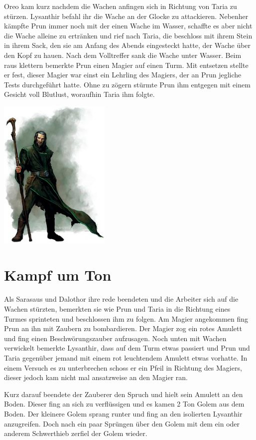 \documentclass[10pt,twoside,twocolumn,openany]{book}
\begin{document}
	Oreo kam kurz nachdem die Wachen anfingen sich in Richtung von Taria zu stürzen. Lysanthir befahl ihr die Wache an der Glocke zu attackieren. Nebenher kämpfte Prun immer noch mit der einen Wache im Wasser, schaffte es aber nicht die Wache alleine zu ertränken und rief nach Taria, die beschloss mit ihrem Stein in ihrem Sack, den sie am Anfang des Abends eingesteckt hatte, der Wache über den Kopf zu hauen. Nach dem Volltreffer sank die Wache unter Wasser. Beim raus klettern bemerkte Prun einen Magier auf einen Turm. Mit entsetzen stellte er fest, dieser Magier war einst ein Lehrling des Magiers, der an Prun jegliche Tests durchgeführt hatte. Ohne zu zögern stürmte Prun ihm entgegen mit einem Gesicht voll Blutlust, woraufhin Taria ihm folgte. 

	\vspace*{3cm}
	\includegraphics[width=0.40\textwidth]{evilSorcererAprentice}
	\newpage
	\section{Kampf um Ton}
	
	Als Sarasaus und Dalothor ihre rede beendeten und die Arbeiter sich auf die Wachen stürzten, bemerkten sie wie Prun und Taria in die Richtung eines Turmes sprinteten und beschlossen ihm zu folgen. Am Magier angekommen fing Prun an ihn mit Zaubern zu bombardieren. Der Magier zog ein rotes Amulett und fing einen Beschwörungszauber aufzusagen. Noch unten mit Wachen verwickelt bemerkte Lysanthir, dass auf dem Turm etwas passiert und Prun und Taria gegenüber jemand mit einem rot leuchtendem Amulett etwas vorhatte. In einem Versuch es zu unterbrechen schoss er ein Pfeil in Richtung des Magiers, dieser jedoch kam nicht mal ansatzweise an den Magier ran. 
	
	Kurz darauf beendete der Zauberer den Spruch und hielt sein Amulett an den Boden. Dieser fing an sich zu verflüssigen und es kamen 2 Ton Golem aus dem Boden. Der kleinere Golem sprang runter und fing an den isolierten Lysanthir anzugreifen. Doch nach ein paar Sprüngen über den Golem mit dem ein oder anderem Schwerthieb zerfiel der Golem wieder.
	
\end{document}
